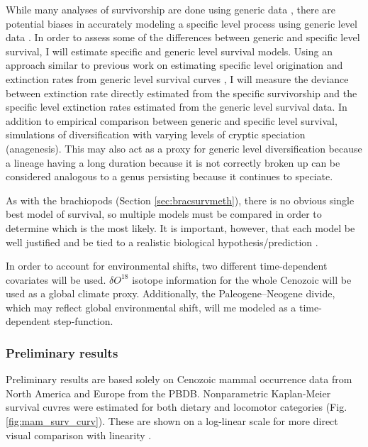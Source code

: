 \documentclass[12pt,letterpaper]{article}
\begin{document}
While many analyses of survivorship are done using generic data \citep{Tomiya2013,Liow2008,Harnik2013,Finnegan2008,Foote2006}, there are potential biases in accurately modeling a specific level process using generic level data \citep{Raup1975,Sepkoski1975,Simpson2006,Raup1991a,VanValen1979}. In order to assess some of the differences between generic and specific level survival, I will estimate specific and generic level survival models. Using an approach similar to previous work on estimating specific level origination and extinction rates from generic level survival curves \citep{Foote1988}, I will measure the deviance between extinction rate directly estimated from the specific survivorship and the specific level extinction rates estimated from the generic level survival data. In addition to empirical comparison between generic and specific level survival, simulations of diversification with varying levels of cryptic speciation (anagenesis). This may also act as a proxy for generic level diversification because a lineage having a long duration because it is not correctly broken up can be considered analogous to a genus persisting because it continues to speciate.

As with the brachiopods (Section \ref{sec:bracsurvmeth}), there is no obvious single best model of survival, so multiple models must be compared in order to determine which is the most likely. It is important, however, that each model be well justified and be tied to a realistic biological hypothesis/prediction \citep{Burnham2002a}. 

In order to account for environmental shifts, two different time-dependent covariates will be used. \(\delta O^{18}\) isotope information for the whole Cenozoic \citep{Zachos2008} will be used as a global climate proxy. Additionally, the Paleogene--Neogene divide, which may reflect global environmental shift, will me modeled as a time-dependent step-function.

\subsubsection{Preliminary results}
Preliminary results are based solely on Cenozoic mammal occurrence data from North America and Europe from the PBDB. Nonparametric Kaplan-Meier survival cuvres were estimated for both dietary and locomotor categories (Fig. \ref{fig:mam_surv_curv}). These are shown on a log-linear scale for more direct visual comparison with linearity \citep{VanValen1973,VanValen1979}.
\end{document}
